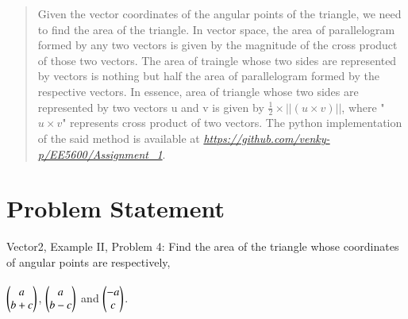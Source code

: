 \documentclass[journal,12pt]{IEEEtran}
\renewcommand\thesection{\arabic{section}}
\begin{document}
\renewcommand{\thetable}{\theenumi}
\begin{abstract}
Given the vector coordinates of the angular points of the triangle, we need to find the area of the triangle. In vector space, the area of parallelogram formed by any two vectors is given by the magnitude of the cross product of those two vectors. The area of traingle whose two sides are represented by vectors is nothing but half the area of parallelogram formed by the respective vectors. In essence, area of triangle whose two sides are represented by two vectors u and v is given by $\frac{1}{2} \times ||(u \times v)||$, where "$u \times v$" represents cross product of two vectors. The python implementation of the said method is available at  \href{https://github.com/venky-p/EE5600/Assignment_1}{\emph{https://github.com/venky-p/EE5600/Assignment\_1}}.
\end{abstract}
%
%

%
\section{Problem Statement}

Vector2, Example II, Problem 4: Find the area of the triangle whose coordinates of angular points are respectively,\\\\ $\begin{pmatrix}a\\b+c\end{pmatrix}$, $\begin{pmatrix}a\\b-c\end{pmatrix}$ and $\begin{pmatrix}-a\\c\end{pmatrix}$.

\end{document}

